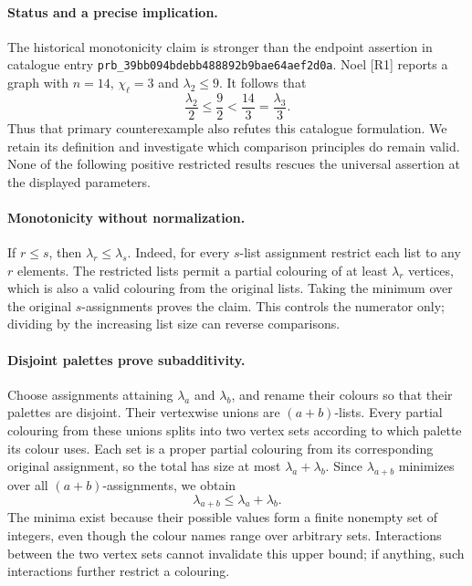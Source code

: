 \documentclass[11pt,a4paper]{article}
\begin{document}
\paragraph{Status and a precise implication.}
The historical monotonicity claim is stronger than the endpoint assertion
in catalogue entry \texttt{prb\_39bb094bdebb488892b9bae64aef2d0a}. Noel [R1] reports a graph with $n=14$,
$\chi_\ell=3$ and $\lambda_2\le9$. It follows that
\[
           \frac{\lambda_2}{2}\le\frac92
           <\frac{14}{3}=\frac{\lambda_3}{3}.
\]
Thus that primary counterexample also refutes this catalogue formulation.
We retain its definition and investigate which comparison principles do
remain valid. None of the following positive restricted results rescues
the universal assertion at the displayed parameters.

\paragraph{Monotonicity without normalization.}
If $r\le s$, then $\lambda_r\le\lambda_s$. Indeed, for every $s$-list
assignment restrict each list to any $r$ elements. The restricted lists
permit a partial colouring of at least $\lambda_r$ vertices, which is
also a valid colouring from the original lists. Taking the minimum over
the original $s$-assignments proves the claim. This controls the numerator
only; dividing by the increasing list size can reverse comparisons.

\paragraph{Disjoint palettes prove subadditivity.}
Choose assignments attaining $\lambda_a$ and $\lambda_b$, and rename
their colours so that their palettes are disjoint. Their vertexwise
unions are $(a+b)$-lists. Every partial colouring from these unions
splits into two vertex sets according to which palette its colour uses.
Each set is a proper partial colouring from its corresponding original
assignment, so the total has size at most $\lambda_a+\lambda_b$.
Since $\lambda_{a+b}$ minimizes over all $(a+b)$-assignments, we obtain
\[
                         \lambda_{a+b}\le\lambda_a+\lambda_b.
\]
The minima exist because their possible values form a finite nonempty
set of integers, even though the colour names range over arbitrary sets.
Interactions between the two vertex sets cannot invalidate this upper
bound; if anything, such interactions further restrict a colouring.
\end{document}
